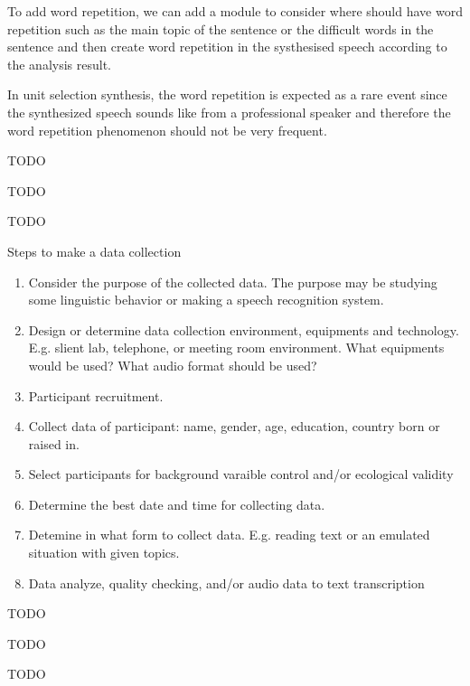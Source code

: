 \documentclass[12pt]{article}
\newenvironment{problem}[2][Problem]{\begin{trivlist}
\item[\hskip \labelsep {\bfseries #1}\hskip \labelsep {\bfseries #2.}]}{\end{trivlist}}
\begin{document}
\begin{problem}{2.2}
    To add word repetition, we can add a module to consider where should have 
    word repetition such as the main topic of the sentence or the difficult words
    in the sentence and then create word repetition in the systhesised speech according
    to the analysis result.

    In unit selection synthesis, the word repetition is expected as a rare event
    since the synthesized speech sounds like from a professional speaker and therefore
    the word repetition phenomenon should not be very frequent.
\end{problem}

\begin{problem}{2.3}
    TODO
\end{problem}

\begin{problem}{3.1}
    TODO
\end{problem}

\begin{problem}{3.2}
    TODO
\end{problem}

\begin{problem}{4.1}
    Steps to make a data collection
    \begin{enumerate}
        \item Consider the purpose of the collected data. The purpose may be 
        studying some linguistic behavior or making a speech recognition system.
        \item Design or determine data collection environment, equipments and technology.
        E.g. slient lab, telephone, or meeting room environment. 
        What equipments would be used? What audio format should be used?
        \item Participant recruitment.
        \item Collect data of participant: name, gender, age, education, country born or raised in.
        \item Select participants for background varaible control and/or ecological validity
        \item Determine the best date and time for collecting data.
        \item Detemine in what form to collect data.
        E.g. reading text or an emulated situation with given topics.
        \item Data analyze, quality checking, and/or audio data to text transcription
    \end{enumerate}
\end{problem}

\begin{problem}{4.2}
    TODO
\end{problem}
\begin{problem}{5.1}
    TODO
\end{problem}

\begin{problem}{5.2}
    TODO
\end{problem}
\end{document}
